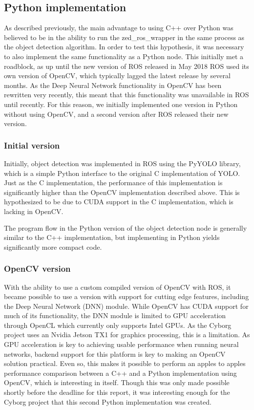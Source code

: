 \documentclass[\rootfolder/main.tex]{subfiles}
\begin{document}
\subsection{Python implementation}

As described previously, the main advantage to using C++ over Python was believed to be in the ability to run the zed\_ros\_wrapper in the same process as the object detection algorithm.
In order to test this hypothesis, it was necessary to also implement the same functionality as a Python node.
This initially met a roadblock, as up until the new version of ROS released in May 2018 ROS used its own version of OpenCV, which typically lagged the latest release by several months.
As the Deep Neural Network functionality in OpenCV has been rewritten very recently, this meant that this functionality was unavailable in ROS until recently.
For this reason, we initially implemented one version in Python without using OpenCV, and a second version after ROS released their new version.

\subsubsection{Initial version}

Initially, object detection was implemented in ROS using the PyYOLO library, which is a simple Python interface to the original C implementation of YOLO.
Just as the C implementation, the performance of this implementation is significantly higher than the OpenCV implementation described above.
This is hypothesized to be due to CUDA support in the C implementation, which is lacking in OpenCV.

The program flow in the Python version of the object detection node is generally similar to the C++ implementation, but implementing in Python yields significantly more compact code.

\subsubsection{OpenCV version}

With the ability to use a custom compiled version of OpenCV with ROS, it became possible to use a version with support for cutting edge features, including the Deep Neural Network (DNN) module.
While OpenCV has CUDA support for much of its functionality, the DNN module is limited to GPU acceleration through OpenCL which currently only supports Intel GPUs.
As the Cyborg project uses an Nvidia Jetson TX1 for graphics processing, this is a limitation.
As GPU acceleration is key to achieving usable performance when running neural networks, backend support for this platform is key to making an OpenCV solution practical.
Even so, this makes it possible to perform an apples to apples performance comparison between a C++ and a Python implementation using OpenCV, which is interesting in itself.
Though this was only made possible shortly before the deadline for this report, it was interesting enough for the Cyborg project that this second Python implementation was created.
\end{document}
